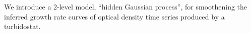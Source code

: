 We introduce a 2-level model, ``hidden Gaussian process'', for smoothening the inferred growth rate curves of optical density time series produced by a turbidostat.
